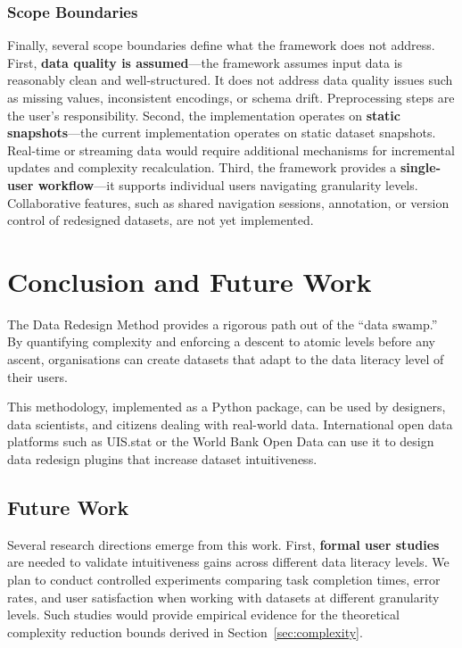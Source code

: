 \documentclass[12pt,a4paper]{article}
\begin{document}
\subsubsection{Scope Boundaries}

Finally, several scope boundaries define what the framework does not address. First, \textbf{data quality is assumed}---the framework assumes input data is reasonably clean and well-structured. It does not address data quality issues such as missing values, inconsistent encodings, or schema drift. Preprocessing steps are the user's responsibility. Second, the implementation operates on \textbf{static snapshots}---the current implementation operates on static dataset snapshots. Real-time or streaming data would require additional mechanisms for incremental updates and complexity recalculation. Third, the framework provides a \textbf{single-user workflow}---it supports individual users navigating granularity levels. Collaborative features, such as shared navigation sessions, annotation, or version control of redesigned datasets, are not yet implemented.

\section{Conclusion and Future Work}
\label{sec:conclusion}

\noindent The Data Redesign Method provides a rigorous path out of the ``data swamp.'' By quantifying complexity and enforcing a descent to atomic levels before any ascent, organisations can create datasets that adapt to the data literacy level of their users.

\vspace{1em}

\noindent This methodology, implemented as a Python package, can be used by designers, data scientists, and citizens dealing with real-world data. International open data platforms such as UIS.stat or the World Bank Open Data can use it to design data redesign plugins that increase dataset intuitiveness.

\subsection{Future Work}

Several research directions emerge from this work. First, \textbf{formal user studies} are needed to validate intuitiveness gains across different data literacy levels. We plan to conduct controlled experiments comparing task completion times, error rates, and user satisfaction when working with datasets at different granularity levels. Such studies would provide empirical evidence for the theoretical complexity reduction bounds derived in Section~\ref{sec:complexity}.
\end{document}
